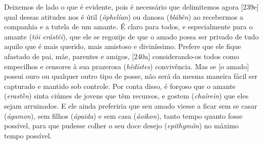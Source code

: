 Deixemos de lado o que é evidente, pois é necessário que delimitemos
agora {[}239e{]} qual dessas atitudes nos é útil (\emph{ôphelían}) ou
danosa (\emph{blábên}) ao recebermos a companhia e a tutela de um
amante. É claro para todos, e especialmente para o amante (\emph{tôi
erástêi}), que ele se regozije de que o amado possa ser privado de tudo
aquilo que é mais querido, mais amistoso e diviníssimo. Prefere que ele
fique afastado de pai, mãe, parentes e amigos, {[}240a{]}
considerando-os todos como empecilhos e censores à sua prazerosa
(\emph{hêdístes}) convivência. Mas se {[}o amado{]} possui ouro ou
qualquer outro tipo de posse, não será da mesma maneira fácil ser
capturado e mantido sob controle. Por conta disso, é forçoso que o
amante (\emph{erastḕn}) sinta ciúmes de jovens que têm recursos, e
gostem (\emph{chaírein}) que eles sejam arruinados. E ele ainda
preferiria que seu amado viesse a ficar sem se casar (\emph{ágamon}),
sem filhos (\emph{ápaida}) e sem casa (\emph{áoikon}), tanto tempo
quanto fosse possível, para que pudesse colher o seu doce desejo
(\emph{epithymôn}) no máximo tempo possível.

